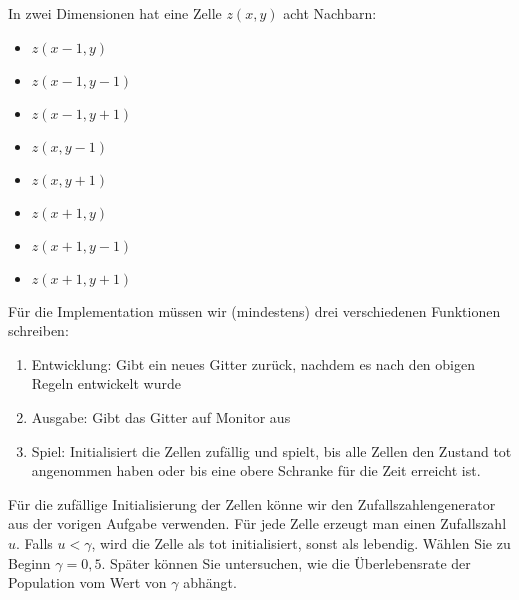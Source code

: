 \documentclass{article}[12pt]
\begin{document}
In zwei Dimensionen hat eine Zelle $z(x,y)$ acht Nachbarn:
\begin{itemize}
\item  $z(x-1,y)$
\item  $z(x-1,y-1)$
\item  $z(x-1,y+1)$
\item  $z(x,y-1)$
\item  $z(x,y+1)$
\item  $z(x+1,y)$
\item  $z(x+1,y-1)$
\item  $z(x+1,y+1)$
\end{itemize}
Für die Implementation müssen wir (mindestens) drei verschiedenen Funktionen schreiben:
\begin{enumerate}
\item Entwicklung: Gibt ein neues Gitter zurück, nachdem es nach den obigen Regeln entwickelt wurde
\item Ausgabe: Gibt das Gitter auf Monitor aus
\item Spiel: Initialisiert die Zellen zufällig und \glqq spielt\grqq, bis alle Zellen den Zustand tot angenommen haben oder bis eine obere Schranke für die Zeit erreicht ist.
\end{enumerate}
Für die zufällige Initialisierung der Zellen könne wir den Zufallszahlengenerator aus der vorigen Aufgabe verwenden.
Für jede Zelle erzeugt man einen Zufallszahl $u$.
Falls $u<\gamma$, wird die Zelle als tot initialisiert, sonst als lebendig.
Wählen Sie zu Beginn $\gamma=0,5$. 
Später können Sie untersuchen, wie die Überlebensrate der Population vom Wert von $\gamma$ abhängt.

\end{document}
